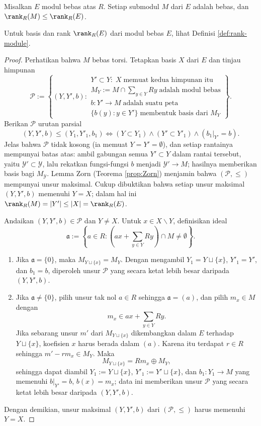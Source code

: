 \begin{lemma}\label{prop:PID-free-submodule}
	Misalkan $E$ modul bebas atas $R$. Setiap submodul $M$ dari $E$ adalah bebas, dan $\rank_R(M) \leq \rank_R(E)$. 
\end{lemma}
Untuk basis dan rank $\rank_R(E)$ dari modul bebas $E$, lihat Definisi \ref{def:rank-module}.
\begin{proof}
	Perhatikan bahwa $M$ bebas torsi. Tetapkan basis $X$ dari $E$ dan tinjau himpunan
	\[ \mathcal{P} := \left\{ (Y,Y',b) :
		\begin{array}{l}
			Y' \subset Y: \; X \; \text{memuat kedua himpunan itu} \\
			M_Y := M \cap \sum_{y \in Y} Ry \; \text{adalah modul bebas} \\
			b: Y' \to M \; \text{adalah suatu peta} \\
			\{b(y) : y \in Y'\} \;\text{membentuk basis dari $M_Y$}
		\end{array}
	\right\}. \]
	Berikan $\mathcal{P}$ urutan parsial
	\[ (Y, Y', b) \leq (Y_1, Y'_1, b_1) \iff (Y \subset Y_1) \wedge (Y' \subset Y'_1) \wedge (b_1|_{Y'} = b). \]
	Jelas bahwa $\mathcal{P}$ tidak kosong (ia memuat $Y=Y'=\emptyset$), dan setiap rantainya mempunyai batas atas: ambil gabungan semua $Y' \subset Y$ dalam rantai tersebut, yaitu $\mathcal{Y}' \subset \mathcal{Y}$, lalu rekatkan fungsi-fungsi $b$ menjadi $\mathcal{Y}' \to M$; hasilnya memberikan basis bagi $M_{\mathcal{Y}}$. Lemma Zorn (Teorema \ref{prop:Zorn}) menjamin bahwa $(\mathcal{P}, \leq)$ mempunyai unsur maksimal. Cukup dibuktikan bahwa setiap unsur maksimal $(Y,Y',b)$ memenuhi $Y=X$; dalam hal ini $\rank_R(M) = |Y'| \leq |X| = \rank_R(E)$.

	Andaikan $(Y,Y',b) \in \mathcal{P}$ dan $Y \neq X$. Untuk $x \in X \smallsetminus Y$, definisikan ideal
	\[ \mathfrak{a} := \left\{a \in R : \left( ax + \sum_{y \in Y} Ry \right) \cap M \neq \emptyset \right\}. \]
	\begin{enumerate}
		\item Jika $\mathfrak{a}=\{0\}$, maka $M_{Y \sqcup \{x\}} = M_Y$. Dengan mengambil $Y_1 = Y \sqcup \{x\}$, $Y'_1 = Y'$, dan $b_1 = b$, diperoleh unsur $\mathcal{P}$ yang secara ketat lebih besar daripada $(Y,Y',b)$.
		\item Jika $\mathfrak{a} \neq \{0\}$, pilih unsur tak nol $a \in R$ sehingga $\mathfrak{a} = (a)$, dan pilih $m_x \in M$ dengan
			\[ m_x \in ax + \sum_{y \in Y} Ry. \]
			Jika sebarang unsur $m'$ dari $M_{Y \sqcup \{x\}}$ dikembangkan dalam $E$ terhadap $Y \sqcup \{x\}$, koefisien $x$ harus berada dalam $(a)$. Karena itu terdapat $r \in R$ sehingga $m' - rm_x \in M_Y$. Maka
			\[ M_{Y \sqcup \{x\}} = Rm_x \oplus M_Y, \]
		sehingga dapat diambil $Y_1 := Y \sqcup \{x\}$, $Y'_1 := Y' \sqcup \{x\}$, dan $b_1: Y_1 \to M$ yang memenuhi $b|_{Y'}=b$, $b(x) = m_x$; data ini memberikan unsur $\mathcal{P}$ yang secara ketat lebih besar daripada $(Y,Y',b)$.
	\end{enumerate}
	Dengan demikian, unsur maksimal $(Y,Y',b)$ dari $(\mathcal{P}, \leq)$ harus memenuhi $Y=X$.
\end{proof}

